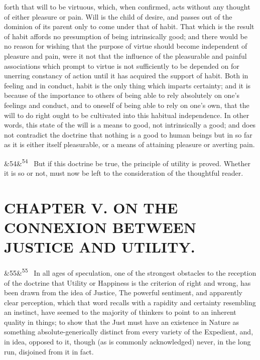\documentclass[12pt]{article}
\newcommand{\para}[1][]{\par\noindent\ifx&#1&\else\textsuperscript{\footnotesize #1}~\fi}
\begin{document}
forth that will to be virtuous, which, when confirmed, acts without any thought of either pleasure or pain. Will is the child of desire, and passes out of the dominion of its parent only to come under that of habit. That which is the result of habit affords no presumption of being intrinsically good; and there would be no reason for wishing that the purpose of virtue should become independent of pleasure and pain, were it not that the influence of the pleasurable and painful associations which prompt to virtue is not sufficiently to be depended on for unerring constancy of action until it has acquired the support of habit. Both in feeling and in conduct, habit is the only thing which imparts certainty; and it is because of the importance to others of being able to rely absolutely on one's feelings and conduct, and to oneself of being able to rely on one's own, that the will to do right ought to be cultivated into this habitual independence. In other words, this state of the will is a means to good, not intrinsically a good; and does not contradict the doctrine that nothing is a good to human beings but in so far as it is either itself pleasurable, or a means of attaining pleasure or averting pain.

\para[54] But if this doctrine be true, the principle of utility is proved. Whether it is so or not, must now be left to the consideration of the thoughtful reader.

\section*{CHAPTER V. ON THE CONNEXION BETWEEN JUSTICE AND UTILITY.}

\para[55] In all ages of speculation, one of the strongest obstacles to the reception of the doctrine that Utility or Happiness is the criterion of right and wrong, has been drawn from the idea of Justice, The powerful sentiment, and apparently clear perception, which that word recalls with a rapidity and certainty resembling an instinct, have seemed to the majority of thinkers to point to an inherent quality in things; to show that the Just must have an existence in Nature as something absolute-generically distinct from every variety of the Expedient, and, in idea, opposed to it, though (as is commonly acknowledged) never, in the long run, disjoined from it in fact.
\end{document}
